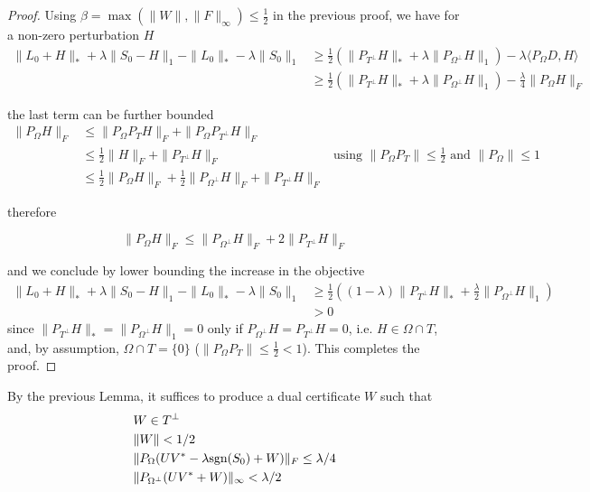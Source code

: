 \begin{proof}
Using $\beta = \max (\|W\|, \|F\|_\infty) \leq \frac{1}{2}$ in the previous proof, we have for a non-zero perturbation $H$
\begin{align*}
\|L_0 + H\|_* + \lambda \|S_0 - H\|_1 - \|L_0\|_* - \lambda \|S_0 \|_1 
&\geq  \frac{1}{2} \left( \|P_{T^\perp} H\|_* + \lambda \|P_{\Omega^\perp} H\|_1 \right) - \lambda \langle P_{\Omega} D, H\rangle \\
& \geq \frac{1}{2} \left( \|P_{T^\perp} H\|_* + \lambda \|P_{\Omega^\perp} H\|_1 \right) - \frac{\lambda}{4} \|P_{\Omega} H\|_F
\end{align*}

the last term can be further bounded
\begin{align*}
\|P_\Omega H\|_F
&\leq \|P_\Omega P_T H\|_F + \|P_\Omega P_{T^\perp} H\|_F \\
&\leq \frac{1}{2} \|H\|_F + \|P_{T^\perp} H\|_F & \text{using } \|P_\Omega P_T\| \leq \frac{1}{2} \text{ and } \|P_\Omega\| \leq 1 \\
&\leq \frac{1}{2} \|P_\Omega H\|_F + \frac{1}{2} \|P_{\Omega^\perp} H\|_F + \|P_{T^\perp} H\|_F
\end{align*}

therefore 

\[
\|P_\Omega H\|_F \leq \|P_{\Omega^\perp} H\|_F + 2 \|P_{T^\perp} H\|_F
\]

and we conclude by lower bounding the increase in the objective
\begin{align*}
\|L_0 + H\|_* + \lambda \|S_0 - H\|_1 - \|L_0\|_* - \lambda \|S_0 \|_1 
&\geq  \frac{1}{2} \left( (1- \lambda) \|P_{T^\perp} H\|_* + \frac{\lambda}{2} \|P_{\Omega^\perp} H\|_1 \right) \\
& > 0
\end{align*}
since $ \|P_{T^\perp} H\|_* =  \|P_{\Omega^\perp} H\|_1 = 0$ only if $P_{\Omega^\perp} H = P_{T^\perp} H = 0$, i.e. $H \in \Omega \cap T$, and, by assumption, $\Omega \cap T = \{ 0 \}$ ($\|P_\Omega P_T\| \leq \frac{1}{2} < 1$).
This completes the proof.

\end{proof}

By the previous Lemma, it suffices to produce a dual certificate $W$ such that
\begin{equation}
\begin{aligned}
& W \in T^{\perp} \\
& \|W\| < 1/2\\
& \|P_\Omega (UV^* - \lambda \text{sgn}(S_0) + W) \|_F \leq \lambda / 4  \\
& \|P_{\Omega^\perp}(UV^* + W)\|_\infty < \lambda / 2
\end{aligned}
\end{equation}

